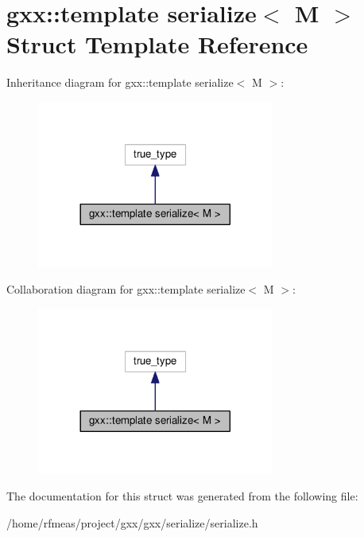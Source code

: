 \hypertarget{structgxx_1_1is__have__serialize_3_01M_00_01T_00_01decltype_07_07void_08_6T_1_1template_01serialize_3_01M_01_4}{}\section{gxx\+:\+:template serialize$<$ M $>$ Struct Template Reference}
\label{structgxx_1_1is__have__serialize_3_01M_00_01T_00_01decltype_07_07void_08_6T_1_1template_01serialize_3_01M_01_4}


Inheritance diagram for gxx\+:\+:template serialize$<$ M $>$\+:
\nopagebreak
\begin{figure}[H]
\begin{center}
\leavevmode
\includegraphics[width=221pt]{structgxx_1_1is__have__serialize_3_01M_00_01T_00_01decltype_07_07void_08_6T_1_1template_01serialize_3_01M_01_4__inherit__graph}
\end{center}
\end{figure}


Collaboration diagram for gxx\+:\+:template serialize$<$ M $>$\+:
\nopagebreak
\begin{figure}[H]
\begin{center}
\leavevmode
\includegraphics[width=221pt]{structgxx_1_1is__have__serialize_3_01M_00_01T_00_01decltype_07_07void_08_6T_1_1template_01serialize_3_01M_01_4__coll__graph}
\end{center}
\end{figure}


The documentation for this struct was generated from the following file\+:\begin{DoxyCompactItemize}
\item 
/home/rfmeas/project/gxx/gxx/serialize/serialize.\+h\end{DoxyCompactItemize}
